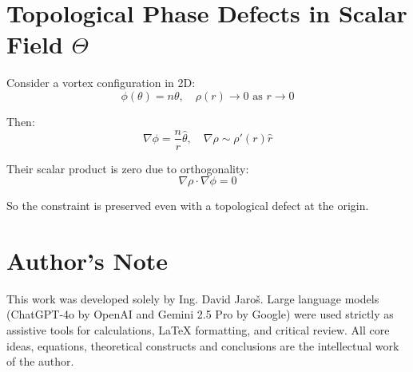 \documentclass{article}
\begin{document}
\section*{Topological Phase Defects in Scalar Field \(\Theta\)}

Consider a vortex configuration in 2D:
\[
\phi(\theta) = n\theta, \quad \rho(r) \to 0 \text{ as } r \to 0
\]

Then:
\[
\nabla \phi = \frac{n}{r} \hat{\theta}, \quad \nabla \rho \sim \rho'(r) \hat{r}
\]

Their scalar product is zero due to orthogonality:
\[
\nabla \rho \cdot \nabla \phi = 0
\]

So the constraint is preserved even with a topological defect at the origin.


\section*{Author's Note}

This work was developed solely by Ing. David Jaroš.  
Large language models (ChatGPT-4o by OpenAI and Gemini 2.5 Pro by Google) were used strictly as assistive tools for calculations, LaTeX formatting, and critical review.  
All core ideas, equations, theoretical constructs and conclusions are the intellectual work of the author.
\end{document}
